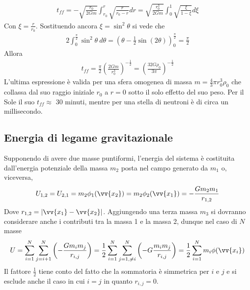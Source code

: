 \documentclass[a4paper, oneside]{book}
\begin{document}
\begin{gather*}
    t_{ff} = - \sqrt{\frac{r_0}{2Gm}} \int_{r_0}^{r}  \sqrt{\frac{r}{r_0 - r}}  dr = \sqrt{\frac{r_0^{3}}{2Gm}} \int_{0}^{1}\sqrt{\frac{\xi }{1 - \xi}} d\xi  
\end{gather*}
Con $\xi = \frac{r}{r_0}$. Sostituendo ancora $\xi = \sin^{2}\theta$ si vede che
\begin{gather*}
    2\int_{0}^{\frac{\pi}{2}} \sin^{2}\theta \ d\theta = \left(\theta - \frac{1}{2}\sin(2\theta)\right) ^{\frac{\pi}{2}}_{0} = \frac{\pi}{2}
\end{gather*}
Allora
\begin{align}
    t_{ff} = \frac{\pi}{2} \left(\frac{2Gm}{r_0^{3}}\right)^{-\frac{1}{2}} = \left(\frac{32G\rho_0}{3\pi}\right)^{-\frac{1}{2}}
\end{align}
L'ultima espressione è valida per una sfera omogenea di massa $m = \frac{4}{3}\pi r_0^{3}\rho_0$ che collassa dal suo raggio iniziale
$r_0$ a $r = 0$ sotto il solo effetto del suo peso. Per il Sole il suo $t_{ff} \approx$ 30 minuti, 
mentre per una stella di neutroni è di circa un millisecondo.

\subsection{Energia di legame gravitazionale}
Supponendo di avere due masse puntiformi, l'energia del sistema è costituita dall'energia potenziale della 
massa $m_2$ posta nel campo generato da $m_1$ o, viceversa, 
\begin{gather*}
    U_{1, 2} = U_{2, 1} = m_2 \phi_1(\vv{x_2} ) = m_2\phi_2(\vv{x_1} ) = - \frac{Gm_2m_1}{r_{1, 2}}
\end{gather*}
Dove $r_{1, 2} = \left| \vv{x_1} - \vv{x_2}    \right|$. Aggiungendo una terza massa $m_3$ si dovranno 
considerare anche i contributi tra la massa 1 e la massa 2, dunque nel caso di $N$ masse 
\begin{align}
    U = \sum_{i = 1}^{N} \sum_{j = i + 1}^{N} \left(- \frac{G m_i m_j}{r_{i, j}}\right)  = \frac{1}{2} \sum_{i = 1}^{N} \sum_{j = 1, \neq i}^{N}\left(- G\frac{m_im_j}{r_{i, j}}\right) = \frac{1}{2} \sum_{i = 1}^{N} m_i \phi(\vv{x_i} ) 
\end{align}
Il fattore $\frac{1}{2}$ tiene conto del fatto che la sommatoria è simmetrica per $i$ e $j$ e si esclude anche
il caso in cui $i = j$ in quanto $r_{i, j}  = 0$. 
\end{document}
